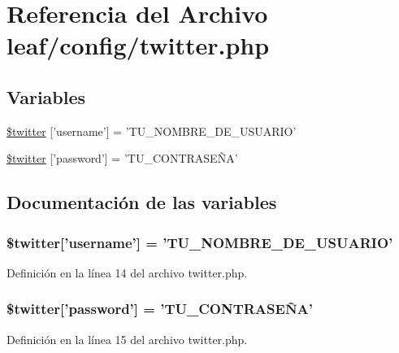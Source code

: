 \hypertarget{twitter_8php}{\section{Referencia del Archivo leaf/config/twitter.php}
\label{twitter_8php}
}
\subsection*{Variables}
\begin{DoxyCompactItemize}
\item 
\hyperlink{twitter_8php_a87677c3b31a8ccf82000c167321eb287}{\$twitter} \mbox{[}'username'\mbox{]} = 'T\-U\-\_\-\-N\-O\-M\-B\-R\-E\-\_\-\-D\-E\-\_\-\-U\-S\-U\-A\-R\-I\-O'
\item 
\hyperlink{twitter_8php_ae826ac28e1dfc8f14b1e1d0861b0eb33}{\$twitter} \mbox{[}'password'\mbox{]} = 'T\-U\-\_\-\-C\-O\-N\-T\-R\-A\-S\-EÑA'
\end{DoxyCompactItemize}


\subsection{Documentación de las variables}
\hypertarget{twitter_8php_a87677c3b31a8ccf82000c167321eb287}{
\subsubsection[{\$twitter}]{\setlength{\rightskip}{0pt plus 5cm}\${\bf twitter}\mbox{[}'username'\mbox{]} = 'T\-U\-\_\-\-N\-O\-M\-B\-R\-E\-\_\-\-D\-E\-\_\-\-U\-S\-U\-A\-R\-I\-O'}}\label{twitter_8php_a87677c3b31a8ccf82000c167321eb287}


Definición en la línea 14 del archivo twitter.\-php.

\hypertarget{twitter_8php_ae826ac28e1dfc8f14b1e1d0861b0eb33}{
\subsubsection[{\$twitter}]{\setlength{\rightskip}{0pt plus 5cm}\${\bf twitter}\mbox{[}'password'\mbox{]} = 'T\-U\-\_\-\-C\-O\-N\-T\-R\-A\-S\-EÑA'}}\label{twitter_8php_ae826ac28e1dfc8f14b1e1d0861b0eb33}


Definición en la línea 15 del archivo twitter.\-php.

